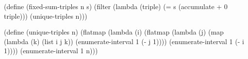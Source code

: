 \begtt\scm
(define (fixed-sum-triples n s)
  (filter (lambda (triple)
            (= s (accumulate + 0 triple)))
          (unique-triples n)))

(define (unique-triples n)
  (flatmap (lambda (i)
             (flatmap (lambda (j)
                        (map (lambda (k) (list i j k))
                             (enumerate-interval 1 (- j 1))))
                      (enumerate-interval 1 (- i 1))))
           (enumerate-interval 1 n)))
\endtt
